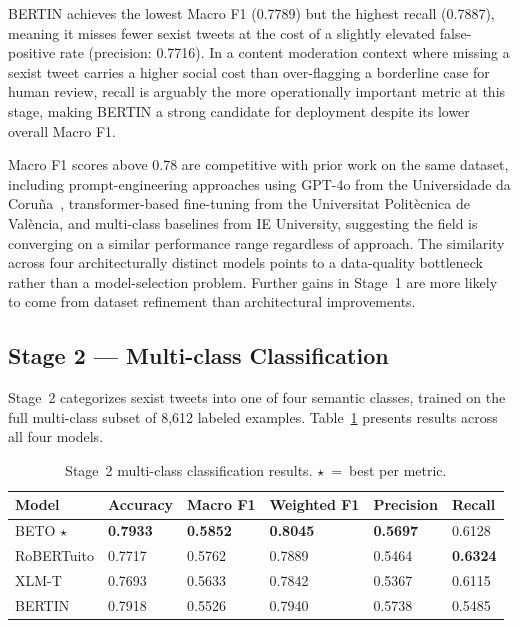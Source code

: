 \documentclass[runningheads]{llncs}
\begin{document}
BERTIN achieves the lowest Macro F1 (0.7789) but the highest recall (0.7887), meaning
it misses fewer sexist tweets at the cost of a slightly elevated false-positive rate
(precision: 0.7716). In a content moderation context where missing a sexist tweet
carries a higher social cost than over-flagging a borderline case for human review,
recall is arguably the more operationally important metric at this stage, making BERTIN
a strong candidate for deployment despite its lower overall Macro F1.

Macro F1 scores above 0.78 are competitive with prior work on the same dataset,
including prompt-engineering approaches using GPT-4o from the Universidade da
Coru\~na~\cite{limaylla2025}, transformer-based fine-tuning from the Universitat
Polit\`ecnica de Val\`encia, and multi-class baselines from IE University, suggesting
the field is converging on a similar performance range regardless of approach. The
similarity across four architecturally distinct models points to a data-quality bottleneck
rather than a model-selection problem. Further gains in Stage~1 are more likely to come
from dataset refinement than architectural improvements.

\subsection{Stage 2 --- Multi-class Classification}

Stage~2 categorizes sexist tweets into one of four semantic classes, trained on the full multi-class subset of 8,612 labeled examples. Table~\ref{tab:stage2} presents results across all four models.

\begin{table}[h]
\caption{Stage~2 multi-class classification results. $\star$~=~best per metric.}
\label{tab:stage2}
\centering
\begin{tabular}{llllll}
\toprule
\textbf{Model} & \textbf{Accuracy} & \textbf{Macro F1} & \textbf{Weighted F1} & \textbf{Precision} & \textbf{Recall} \\
\midrule
BETO $\star$ & \textbf{0.7933} & \textbf{0.5852} & \textbf{0.8045} & \textbf{0.5697} & 0.6128 \\
RoBERTuito & 0.7717 & 0.5762 & 0.7889 & 0.5464 & \textbf{0.6324} \\
XLM-T & 0.7693 & 0.5633 & 0.7842 & 0.5367 & 0.6115 \\
BERTIN & 0.7918 & 0.5526 & 0.7940 & 0.5738 & 0.5485 \\
\bottomrule
\end{tabular}
\end{table}
\end{document}
